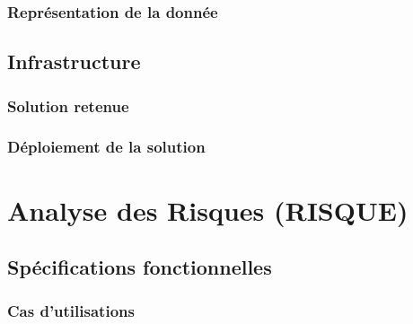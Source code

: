 
\subsubsection{Représentation de la donnée}


\subsection{Infrastructure}

\subsubsection{Solution retenue}


\subsubsection{Déploiement de la solution}


\section{Analyse des Risques (RISQUE)}%

\subsection{Spécifications fonctionnelles}

\subsubsection{Cas d’utilisations}

